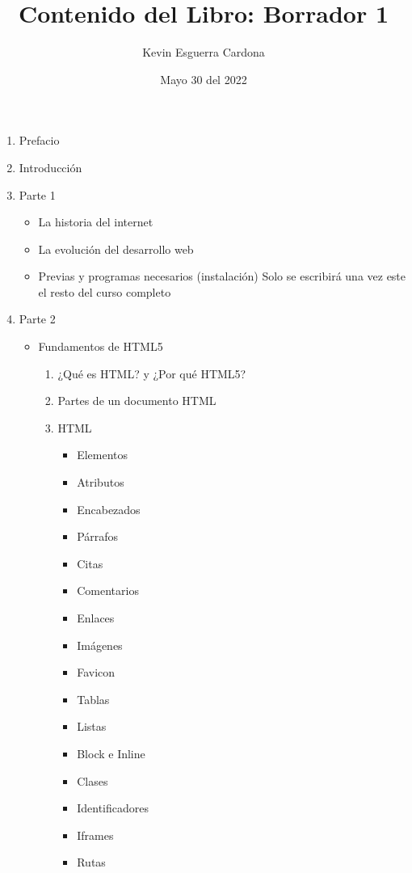 \documentclass[12pt, letterpaper]{article}
\title{Contenido del Libro: Borrador 1}
\author{Kevin  Esguerra Cardona}
\date{Mayo 30 del 2022}
\begin{document}
\maketitle

\begin{enumerate}
    \item Prefacio
    \item Introducción
    \item Parte 1
    \begin{itemize}
        \item La historia del internet
        \item La evolución del desarrollo web
        \item Previas y programas necesarios (instalación) \newline*Solo se escribirá  una vez este el resto del curso completo
    \end{itemize}
    \item Parte 2
    \begin{itemize}
        \item Fundamentos de HTML5
        \begin{enumerate}
            \item ¿Qué es HTML? y ¿Por qué HTML5?
            \item Partes de un documento HTML
            \item HTML
            \begin{itemize}
                \item Elementos
                \item Atributos
                \item Encabezados
                \item Párrafos
                \item Citas
                \item Comentarios
                \item Enlaces
                \item Imágenes
                \item Favicon
                \item Tablas
                \item Listas
                \item Block e Inline
                \item Clases
                \item Identificadores
                \item Iframes
                \item Rutas

\end{itemize}
\end{enumerate}
\end{itemize}
\end{enumerate}
\end{document}

